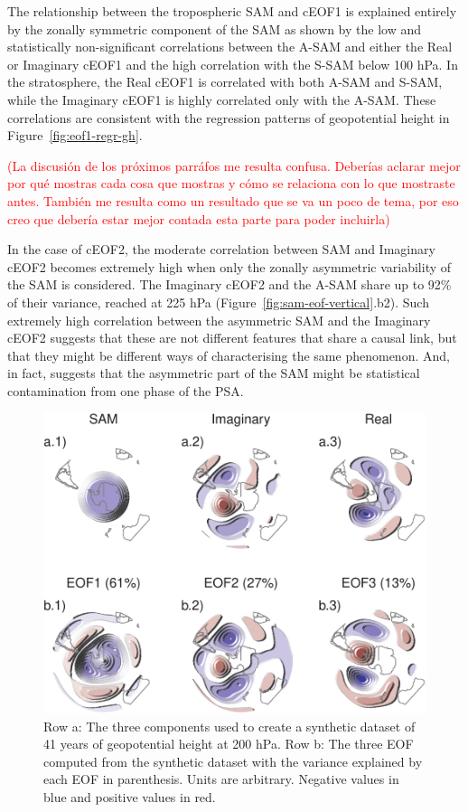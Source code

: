 \documentclass[smallextended]{svjour3}       %
\begin{document}
The relationship between the tropospheric SAM and cEOF1 is explained entirely by the zonally symmetric component of the SAM as shown by the low and statistically non-significant correlations between the A-SAM and either the Real or Imaginary cEOF1 and the high correlation with the S-SAM below 100 hPa. In the stratosphere, the Real cEOF1 is correlated with both A-SAM and S-SAM, while the Imaginary cEOF1 is highly correlated only with the A-SAM. These correlations are consistent with the regression patterns of geopotential height in Figure~\ref{fig:eof1-regr-gh}.

\textcolor{red}{(La discusión de los próximos parráfos me resulta confusa. Deberías aclarar mejor por qué mostras cada cosa que mostras y cómo se relaciona con lo que mostraste antes. También me resulta como un resultado que se va un poco de tema, por eso creo que debería estar mejor contada esta parte para poder incluirla)}

In the case of cEOF2, the moderate correlation between SAM and Imaginary cEOF2 becomes extremely high when only the zonally asymmetric variability of the SAM is considered. The Imaginary cEOF2 and the A-SAM share up to 92\% of their variance, reached at 225 hPa (Figure~\ref{fig:sam-eof-vertical}.b2). Such extremely high correlation between the asymmetric SAM and the Imaginary cEOF2 suggests that these are not different features that share a causal link, but that they might be different ways of characterising the same phenomenon. And, in fact, suggests that the asymmetric part of the SAM might be statistical contamination from one phase of the PSA.



\begin{figure}
\centering
\includegraphics{../figures/fake-eof-1.pdf}
\caption{\label{fig:fake-eof}Row a: The three components used to create a synthetic dataset of 41 years of geopotential height at 200 hPa. Row b: The three EOF computed from the synthetic dataset with the variance explained by each EOF in parenthesis. Units are arbitrary. Negative values in blue and positive values in red.}
\end{figure}
\end{document}
